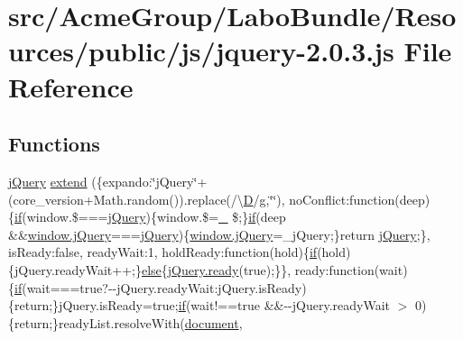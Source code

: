\hypertarget{jquery-2_80_83_8js}{\section{src/\+Acme\+Group/\+Labo\+Bundle/\+Resources/public/js/jquery-\/2.0.3.js File Reference}
\label{jquery-2_80_83_8js}
}
\subsection*{Functions}
\begin{DoxyCompactItemize}
\item 
\hyperlink{_site_bundle_2_resources_2public_2js_2_specific_functions_8js_ada154f66b5b2b806f5e239376e925644}{j\+Query} \hyperlink{jquery-2_80_83_8js_aa388e8b1fc5597ca0fb8a50701930142}{extend} (\{expando\+:\char`\"{}j\+Query\char`\"{}+(core\+\_\+version+Math.\+random()).replace(/\textbackslash{}\hyperlink{jquery_8fancybox_8js_ad741d7cd7e6eda75030b55e36b706c0a}{D}/\hyperlink{fullpage_2plugin_8min_8js_a103df269476e78897c9c4c6cb8f4eb06}{g},\char`\"{}\char`\"{}), no\+Conflict\+:function(deep)\{\hyperlink{fullpage_2plugin_8js_a8b98017e64ef036adb9ae327ff94abe1}{if}(window.\$===\hyperlink{_site_bundle_2_resources_2public_2js_2_specific_functions_8js_ada154f66b5b2b806f5e239376e925644}{j\+Query})\{window.\$=\hyperlink{api_8methods_8js_a9fa21cf6b20968a71a2ed8acf4954e9e}{\+\_\+} \$;\}\hyperlink{fullpage_2plugin_8js_a8b98017e64ef036adb9ae327ff94abe1}{if}(deep \&\&\hyperlink{_site_bundle_2_resources_2public_2js_2_specific_functions_8js_ada154f66b5b2b806f5e239376e925644}{window.\+j\+Query}===\hyperlink{_site_bundle_2_resources_2public_2js_2_specific_functions_8js_ada154f66b5b2b806f5e239376e925644}{j\+Query})\{\hyperlink{_site_bundle_2_resources_2public_2js_2_specific_functions_8js_ada154f66b5b2b806f5e239376e925644}{window.\+j\+Query}=\+\_\+j\+Query;\}return \hyperlink{_site_bundle_2_resources_2public_2js_2_specific_functions_8js_ada154f66b5b2b806f5e239376e925644}{j\+Query};\}, is\+Ready\+:false, ready\+Wait\+:1, hold\+Ready\+:function(hold)\{\hyperlink{fullpage_2plugin_8js_a8b98017e64ef036adb9ae327ff94abe1}{if}(hold)\{j\+Query.\+ready\+Wait++;\}\hyperlink{jquery_8iframe-transport_8js_a0544c3fe466e421738dae463968b70ba}{else}\{\hyperlink{jquery_8fancybox_8pack_8js_a3a17742a5a6ea52e2cca19a6325ebe99}{j\+Query.\+ready}(true);\}\}, ready\+:function(wait)\{\hyperlink{fullpage_2plugin_8js_a8b98017e64ef036adb9ae327ff94abe1}{if}(wait===true?-\/-\/j\+Query.\+ready\+Wait\+:j\+Query.\+is\+Ready)\{return;\}j\+Query.\+is\+Ready=true;\hyperlink{fullpage_2plugin_8js_a8b98017e64ef036adb9ae327ff94abe1}{if}(wait!==true \&\&-\/-\/j\+Query.\+ready\+Wait $>$ 0)\{return;\}ready\+List.\+resolve\+With(\hyperlink{outside_events_8js_aa14f8e0338cced6720590fd2ea13bd4b}{document}, 
\end{DoxyCompactItemize}

